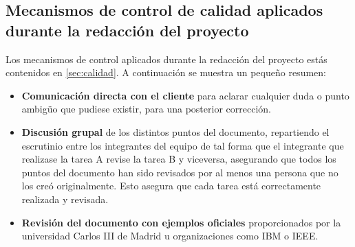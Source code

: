 \subsection{Mecanismos de control de calidad aplicados durante la redacción del proyecto}
\par Los mecanismos de control aplicados durante la redacción del proyecto estás contenidos en  \ref{sec:calidad}. A continuación se muestra un pequeño resumen:
\begin{itemize}
	\item \textbf{Comunicación directa con el cliente} para aclarar cualquier duda o punto ambigüo que pudiese existir, para una posterior corrección.
	\item \textbf{Discusión grupal} de los distintos puntos del documento, repartiendo el escrutinio entre los integrantes del equipo de tal forma que el integrante que realizase la tarea A revise la tarea B y viceversa, asegurando que todos los puntos del documento han sido revisados por al menos una persona que no los creó originalmente. Esto asegura que cada tarea está correctamente realizada y revisada.
	\item \textbf{Revisión del documento con ejemplos oficiales} proporcionados por la universidad Carlos III de Madrid u organizaciones como IBM o IEEE.
\end{itemize}
